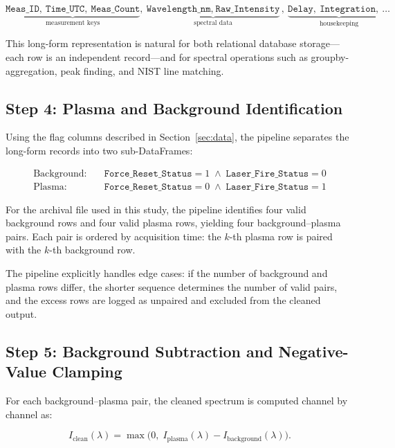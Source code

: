 \documentclass[a4paper,twocolumn,10pt]{article}
\begin{document}
\begin{equation}
\label{eq:long_form}
\underbrace{\texttt{Meas\_ID},\ \texttt{Time\_UTC},\ \texttt{Meas\_Count}}_{
  \text{measurement keys}}
,\
\underbrace{\texttt{Wavelength\_nm},\ \texttt{Raw\_Intensity}}_{
  \text{spectral data}}
,\
\underbrace{\texttt{Delay},\ \texttt{Integration},\ \ldots}_{
  \text{housekeeping}}
\end{equation}

This long-form representation is natural for both relational database
storage---each row is an independent record---and for spectral
operations such as groupby-aggregation, peak finding, and NIST line
matching.

\subsection{Step 4: Plasma and Background Identification}

Using the flag columns described in Section~\ref{sec:data}, the
pipeline separates the long-form records into two sub-DataFrames:

\begin{align}
\label{eq:bg_mask}
\text{Background:}\quad&
  \texttt{Force\_Reset\_Status} = 1
  \;\wedge\;
  \texttt{Laser\_Fire\_Status} = 0 \\
\label{eq:plasma_mask}
\text{Plasma:}\quad&
  \texttt{Force\_Reset\_Status} = 0
  \;\wedge\;
  \texttt{Laser\_Fire\_Status} = 1
\end{align}

For the archival file used in this study, the pipeline identifies
four valid background rows and four valid plasma rows, yielding four
background--plasma pairs.  Each pair is ordered by acquisition time:
the $k$-th plasma row is paired with the $k$-th background row.

The pipeline explicitly handles edge cases: if the number of
background and plasma rows differ, the shorter sequence determines the
number of valid pairs, and the excess rows are logged as unpaired and
excluded from the cleaned output.

\subsection{Step 5: Background Subtraction and Negative-Value Clamping}

For each background--plasma pair, the cleaned spectrum is computed
channel by channel as:

\begin{equation}
\label{eq:subtraction}
I_{\text{clean}}(\lambda) =
  \max\!\bigl(0,\;
  I_{\text{plasma}}(\lambda) - I_{\text{background}}(\lambda)
  \bigr).
\end{equation}
\end{document}
